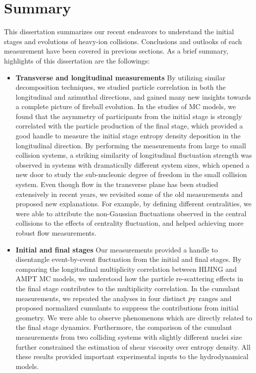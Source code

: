 \section{Summary}
\label{chapter:summary}

This dissertation summarizes our recent endeavors to understand the initial stages and evolutions of heavy-ion collisions. Conclusions and outlooks of each measurement have been covered in previous sections. As a brief summary, highlights of this dissertation are the followings:
\begin{itemize}
\item \textbf{Transverse and longitudinal measurements} By utilizing similar decomposition techniques, we studied particle correlation in both the longitudinal and azimuthal directions, and gained many new insights towards a complete picture of fireball evolution. In the studies of MC models, we found that the asymmetry of participants from the initial stage is strongly correlated with the particle production of the final stage, which provided a good handle to measure the initial stage entropy density deposition in the longitudinal direction. By performing the measurements from large to small collision systems, a striking similarity of longitudinal fluctuation strength was observed in systems with dramatically different system sizes, which opened a new door to study the sub-nucleonic degree of freedom in the small collision system. Even though flow in the transverse plane has been studied extensively in recent years, we revisited some of the old measurements and proposed new explanations. For example, by defining different centralities, we were able to attribute the non-Gaussian fluctuations observed in the central collisions to the effects of centrality fluctuation, and helped achieving more robust flow measurements.
\item \textbf{Initial and final stages} Our measurements provided a handle to disentangle event-by-event fluctuation from the initial and final stages. By comparing the longitudinal multiplicity correlation between HIJING and AMPT MC models, we understood how the particle re-scattering effects in the final stage contributes to the multiplicity correlation. In the cumulant measurements, we repeated the analyses in four distinct $p_\text{T}$ ranges and proposed normalized cumulants to suppress the contributions from initial geometry. We were able to observe phenomenons which are directly related to the final stage dynamics. Furthermore, the comparison of the cumulant measurements from two colliding systems with slightly different nuclei size further constrained the estimation of shear viscosity over entropy density. All these results provided important experimental inputs to the hydrodynamical models.

\end{itemize}
